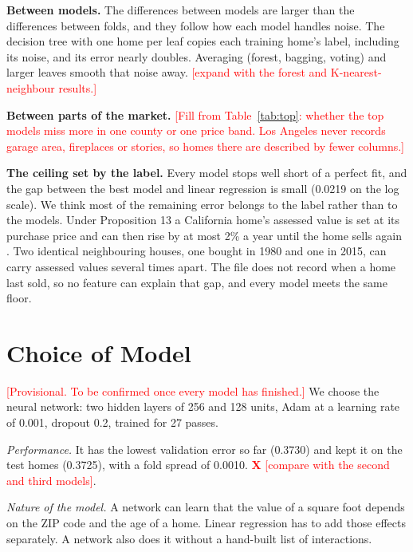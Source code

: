 \documentclass[sigconf,nonacm,10pt]{acmart}
\newcommand{\X}{\textcolor{red}{\textbf{X}}}
\newcommand{\pending}[1]{\textcolor{red}{[#1]}}
\begin{document}
\textbf{Between models.} The differences between models are larger than the differences between folds, and they follow how each model handles noise. The decision tree with one home per leaf copies each training home's label, including its noise, and its error nearly doubles. Averaging (forest, bagging, voting) and larger leaves smooth that noise away. \pending{expand with the forest and K-nearest-neighbour results.}

\textbf{Between parts of the market.} \pending{Fill from Table~\ref{tab:top}: whether the top models miss more in one county or one price band. Los Angeles never records garage area, fireplaces or stories, so homes there are described by fewer columns.}

\textbf{The ceiling set by the label.} Every model stops well short of a perfect fit, and the gap between the best model and linear regression is small (0.0219 on the log scale). We think most of the remaining error belongs to the label rather than to the models. Under Proposition 13 a California home's assessed value is set at its purchase price and can then rise by at most 2\% a year until the home sells again \cite{prop13}. Two identical neighbouring houses, one bought in 1980 and one in 2015, can carry assessed values several times apart. The file does not record when a home last sold, so no feature can explain that gap, and every model meets the same floor.

\section{Choice of Model}
\label{sec:choice}

\pending{Provisional. To be confirmed once every model has finished.} We choose the neural network: two hidden layers of 256 and 128 units, Adam at a learning rate of 0.001, dropout 0.2, trained for 27 passes.

\emph{Performance.} It has the lowest validation error so far (0.3730) and kept it on the test homes (0.3725), with a fold spread of 0.0010. \X{} \pending{compare with the second and third models}.

\emph{Nature of the model.} A network can learn that the value of a square foot depends on the ZIP code and the age of a home. Linear regression has to add those effects separately. A network also does it without a hand-built list of interactions.
\end{document}
